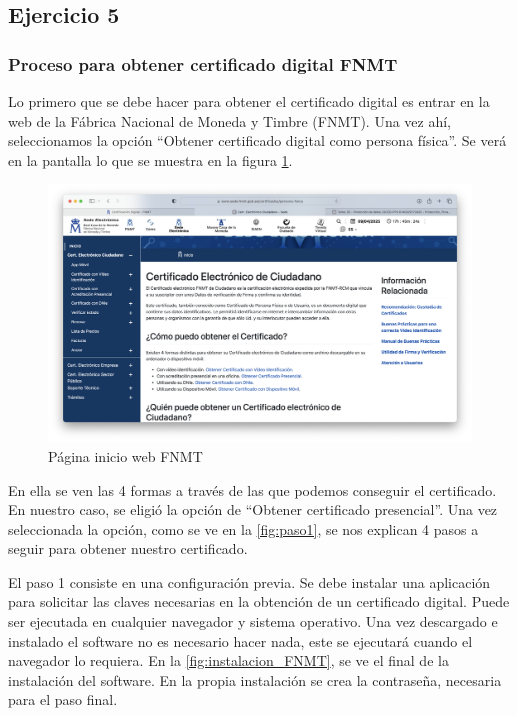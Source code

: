 \subsection{Ejercicio 5}
\graphicspath{ {img/05} }

\subsubsection{Proceso para obtener certificado digital FNMT}

Lo primero que se debe hacer para obtener el certificado digital es entrar en la web de la Fábrica Nacional de Moneda y Timbre (FNMT). Una vez ahí, seleccionamos la opción “Obtener certificado digital como persona física”. Se verá en la pantalla lo que se muestra en la figura \ref{fig:web_ej5a}.

\begin{figure}[H]
    \centering
    \includegraphics[width=\textwidth]{web_ej5a.png}
    \caption{Página inicio web FNMT}
    \label{fig:web_ej5a}
\end{figure}

En ella se ven las 4 formas a través de las que podemos conseguir el certificado. En nuestro caso, se eligió la opción de “Obtener certificado presencial”. Una vez seleccionada la opción, como se ve en la \ref{fig:paso1}, se nos explican 4 pasos a seguir para obtener nuestro certificado.

El paso 1 consiste en una configuración previa. Se debe instalar una aplicación para solicitar las claves necesarias en la obtención de un certificado digital. Puede ser ejecutada en cualquier navegador y sistema operativo. Una vez descargado e instalado el software no es necesario hacer nada, este se ejecutará cuando el navegador lo requiera. En la \ref{fig:instalacion_FNMT}, se ve el final de la instalación del software. En la propia instalación se crea la contraseña, necesaria para el paso final.

